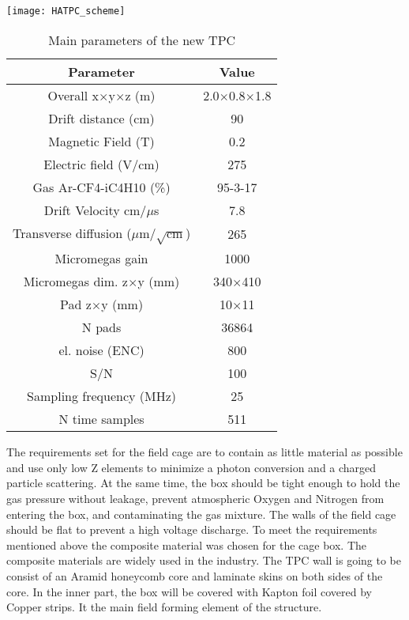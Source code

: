 \documentclass[../main.tex]{subfiles}
\begin{document}
\begin{table}
\begin{minipage}[!ht]{0.49\linewidth}
  \texttt{[image: HATPC\_scheme]}
  \label{fig:up:tpc_s}
\end{minipage}
\hfill
\begin{minipage}[!ht]{0.49\linewidth}
  \begin{tabular}{|c|c|}
    \hline
    Parameter             & Value \\
    \hline
    Overall x$\times$y$\times$z (m)   & 2.0$\times$0.8$\times$1.8 \\
    Drift distance (cm)               & 90 \\
    Magnetic Field (T)                & 0.2 \\
    Electric field (V/cm)             & 275 \\
    Gas Ar-CF4-iC4H10 (\%)            & 95-3-17 \\
    Drift Velocity cm/$\mu$s          & 7.8 \\
    Transverse diffusion ($\mu$m/$\sqrt{\text{cm}}$) & 265 \\
    Micromegas gain                   & 1000 \\
    Micromegas dim. z$\times$y (mm)   & 340$\times$410 \\
    Pad z$\times$y (mm) & 10$\times$11 \\
    N pads                            & 36864 \\
    el. noise (ENC)                   & 800 \\
    S/N                               & 100 \\
    Sampling frequency (MHz)          & 25 \\
    N time samples                    & 511 \\
    \hline
  \end{tabular}
  \caption{Main parameters of the new TPC}
  \label{tbl:up:tpc_p}
\end{minipage}
\end{table}

The requirements set for the field cage are to contain as little material as possible and use only low Z elements to minimize a photon conversion and a charged particle scattering. At the same time, the box should be tight enough to hold the gas pressure without leakage, prevent atmospheric Oxygen and Nitrogen from entering the box, and contaminating the gas mixture. The walls of the field cage should be flat to prevent a high voltage discharge. To meet the requirements mentioned above the composite material was chosen for the cage box. The composite materials are widely used in the industry. The TPC wall is going to be consist of an Aramid honeycomb core and laminate skins on both sides of the core. In the inner part, the box will be covered with Kapton foil covered by Copper strips. It the main field forming element of the structure.
\end{document}
